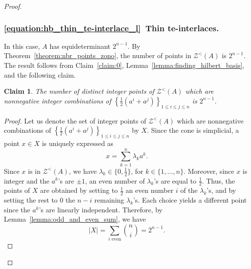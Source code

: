 \documentclass[11pt,a4paper]{amsart}
\renewcommand*{\leq}{\leqslant}
\theoremstyle{plain}
\newtheorem*{claimproof}{Proof of the claim}{\itshape}{\rmfamily}
\newtheorem{claimnumb}{Claim}[theorem]{\itshape}{\rmfamily}
\theoremstyle{definition}
\newcommand{\cal}[1]{\mathcal{#1}}
\newcommand{\Z}{\mathbb{Z}}
\DeclareMathOperator{\gcddet}{gcddet}
\renewcommand{\cal}[1]{\mathcal{#1}}
\begin{document}
\begin{proof}
\subsubsection*{\ref{equation:hb_thin_te-interlace_l}~Thin te-interlaces.}
In this case, $A$ has equideterminant $2^{n-1}$.
By Theorem~\ref{theorem:nbr_points_zono}, the number of points in $\cal Z^<(A)$ is $2^{n-1}$.
The result follows from Claim~\ref{claim:0}, Lemma~\ref{lemma:finding_hilbert_basis}, and the following claim.
\begin{claimnumb}\label{claim:2}
The number of distinct integer points of $\cal Z^<(A)$ which are nonnegative integer combinations of $\left\{\frac{1}{2} (a^i + a^j)\right\}_{1\leq i\leq j\leq n}$ is $2^{n-1}$.
\end{claimnumb}
\begin{proof}
Let us denote the set of integer points of $\cal{Z}^<(A)$ which are nonnegative combinations of $\left\{\frac{1}{2} (a^i + a^j)\right\}_{1\leq i\leq j\leq n}$ by $X$.
Since the cone is simplicial, a point $x\in X$ is uniquely expressed as
$$x = \sum_{k=1}^n \lambda_k a^k.$$
Since $x$ is in $\cal Z^<(A)$, we have $\lambda_k\in\{0,\frac{1}{2}\}$, for $k\in\{1,\ldots,n\}$. 
Moreover, since $x$ is integer and the $a^k$'s are $\pm1$, an even number of $\lambda_k$'s are equal to $\frac{1}{2}$.
Thus, the points of $X$ are obtained by setting to $\frac{1}{2}$ an even number $i$ of the $\lambda_k$'s, and by setting the rest to $0$ the $n-i$ remaining $\lambda_k$'s.
Each choice yields a different point since the $a^k$'s are linearly independent. Therefore, by Lemma~\ref{lemma:odd_and_even_sum}, we have		
$$|X| = \sum_{i\text{ even}} \binom{n}{i} = 2^{n-1}.$$
\end{proof}


\end{proof}
\end{document}
